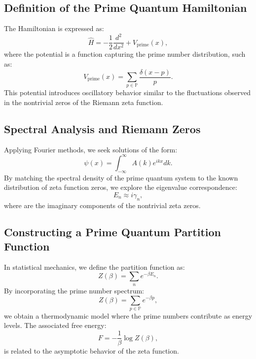 \documentclass{article}
\theoremstyle{plain}
\theoremstyle{plain}
\theoremstyle{definition}
\theoremstyle{remark}
\begin{document}
\subsection{Definition of the Prime Quantum Hamiltonian}
The Hamiltonian is expressed as:
\begin{equation}
\hat{H} = -\frac{1}{2} \frac{d^2}{dx^2} + V_{\text{prime}}(x),
\end{equation}
where the potential  is a function capturing the prime number distribution, such as:
\begin{equation}
V_{\text{prime}}(x) = \sum_{p \in \mathbb{P}} \frac{\delta(x - p)}{p}.
\end{equation}
This potential introduces oscillatory behavior similar to the fluctuations observed in the nontrivial zeros of the Riemann zeta function.

\subsection{Spectral Analysis and Riemann Zeros}
Applying Fourier methods, we seek solutions of the form:
\begin{equation}
\psi(x) = \int_{-\infty}^{\infty} A(k) e^{i k x} dk.
\end{equation}
By matching the spectral density of the prime quantum system to the known distribution of zeta function zeros, we explore the eigenvalue correspondence:
\begin{equation}
E_n \approx i \gamma_n,
\end{equation}
where  are the imaginary components of the nontrivial zeta zeros.

\subsection{Constructing a Prime Quantum Partition Function}
In statistical mechanics, we define the partition function as:
\begin{equation}
Z(\beta) = \sum_{n} e^{-\beta E_n}.
\end{equation}
By incorporating the prime number spectrum:
\begin{equation}
Z(\beta) = \sum_{p \in \mathbb{P}} e^{-\beta p},
\end{equation}
we obtain a thermodynamic model where the prime numbers contribute as energy levels. The associated free energy:
\begin{equation}
F = -\frac{1}{\beta} \log Z(\beta),
\end{equation}
is related to the asymptotic behavior of the zeta function.
\end{document}
